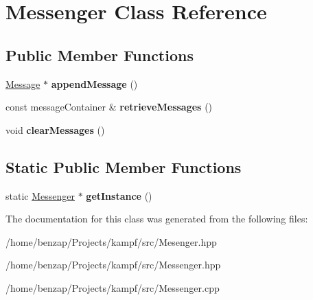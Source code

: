 \hypertarget{classMessenger}{\section{Messenger Class Reference}
\label{classMessenger}
}
\subsection*{Public Member Functions}
\begin{DoxyCompactItemize}
\item 
\hypertarget{classMessenger_a3cb66a55f749fab65afd04a4c4e792e3}{\hyperlink{classMessage}{Message} $\ast$ {\bfseries append\-Message} ()}\label{classMessenger_a3cb66a55f749fab65afd04a4c4e792e3}

\item 
\hypertarget{classMessenger_a1f615376821055a8f0da4c6117ce2eee}{const message\-Container \& {\bfseries retrieve\-Messages} ()}\label{classMessenger_a1f615376821055a8f0da4c6117ce2eee}

\item 
\hypertarget{classMessenger_ae3d002bfa54b9bf89f51b6322443e5e9}{void {\bfseries clear\-Messages} ()}\label{classMessenger_ae3d002bfa54b9bf89f51b6322443e5e9}

\end{DoxyCompactItemize}
\subsection*{Static Public Member Functions}
\begin{DoxyCompactItemize}
\item 
\hypertarget{classMessenger_a3b7c8c1f7841de23c8ba887d50ccb778}{static \hyperlink{classMessenger}{Messenger} $\ast$ {\bfseries get\-Instance} ()}\label{classMessenger_a3b7c8c1f7841de23c8ba887d50ccb778}

\end{DoxyCompactItemize}


The documentation for this class was generated from the following files\-:\begin{DoxyCompactItemize}
\item 
/home/benzap/\-Projects/kampf/src/Mesenger.\-hpp\item 
/home/benzap/\-Projects/kampf/src/Messenger.\-hpp\item 
/home/benzap/\-Projects/kampf/src/Messenger.\-cpp\end{DoxyCompactItemize}

